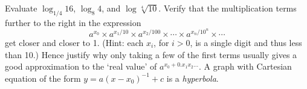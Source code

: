 \begin{questions}
  \question Evaluate $ \log_{1/4} 16 $, $ \log_8 4 $, and $ \log \sqrt[4]{10} $.
  \question Verify that the multiplication terms further to the right in the expression
            \begin{displaymath}
              a^{x_0} \times a^{x_1/10} \times a^{x_2/100} \times \cdots \times a^{x_n/10^n} \times \cdots
            \end{displaymath}
            get closer and closer to 1. (Hint: each $ x_i $, for $ i > 0 $, is a single digit and thus less than 10.) Hence justify why only taking a few
            of the first terms usually gives a good approximation to the `real value' of $ a^{x_0 + 0.x_1x_2\dots} $.
  \question A graph with Cartesian equation of the form $ y = a(x - x_0)^{-1} + c $ is a \emph{hyperbola}.
\end{questions}

